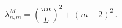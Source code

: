 \begin{equation}
\label{eig}
{\lambda_{n,m}^M}=\left(\frac{\pi n}{L}\right)^2+(m+2)^2\,.
\end{equation}

